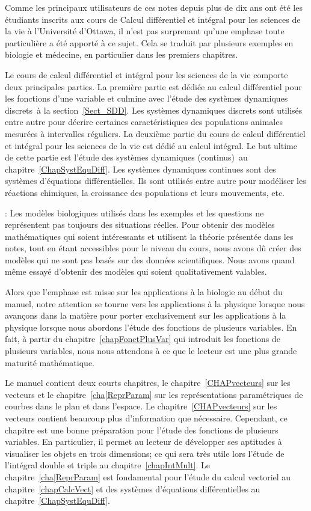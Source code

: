Comme les principaux utilisateurs de ces notes depuis plus de dix ans
ont été les étudiants inscrits aux cours de Calcul différentiel et
intégral pour les sciences de la vie à l'Université d'Ottawa, il n'est
pas surprenant qu'une emphase toute particulière a été apporté à ce
sujet.  Cela se traduit par plusieurs exemples en biologie et
médecine, en particulier dans les premiers chapitres.

Le cours de calcul différentiel et intégral pour les sciences de la
vie comporte deux principales parties.  La première partie
est dédiée au calcul différentiel pour les fonctions d'une variable et
culmine avec l'étude des \lgm systèmes dynamiques discrets\rgm\ à la
section~\ref{Sect_SDD}.  Les systèmes dynamiques discrets sont
utilisés entre autre pour décrire certaines caractéristiques des
populations animales mesurées à intervalles réguliers.
La deuxième partie du cours de calcul différentiel et intégral pour
les sciences de la vie est dédié au calcul intégral.  Le but ultime de
cette partie est l'étude des \lgm systèmes dynamiques (continus)\rgm\ 
au chapitre~\ref{ChapSystEquDiff}.  Les systèmes dynamiques continues
sont des systèmes d'équations différentielles.  Ils sont utilisés
entre autre pour modéliser les réactions chimiques, la croissance des
populations et leurs mouvements, etc.

: Les modèles biologiques utilisés
dans les exemples et les questions ne représentent pas toujours des
situations réelles.  Pour obtenir des modèles mathématiques qui soient
intéressants et utilisent la théorie présentée dans les notes, tout en
étant accessibles pour le niveau du cours, nous avons dû créer des
modèles qui ne sont pas basés sur des données scientifiques.  Nous
avons quand même essayé d'obtenir des modèles qui soient qualitativement
valables.

Alors que l'emphase est misse sur les applications à la biologie au
début du manuel, notre attention se tourne vers les applications à la
physique lorsque nous avançons dans la matière pour porter exclusivement
sur les applications à la physique lorsque nous abordons l'étude des
fonctions de plusieurs variables.  En fait, à partir du
chapitre~\ref{chapFonctPlusVar} qui introduit les fonctions de
plusieurs variables, nous nous attendons à ce que le lecteur est
une plus grande maturité mathématique.

Le manuel contient deux courts chapitres, le
chapitre~\ref{CHAPvecteurs} sur les vecteurs et le
chapitre~\ref{cha[ReprParam} sur les représentations paramétriques de
courbes dans le plan et dans l'espace.  Le
chapitre~\ref{CHAPvecteurs} sur les vecteurs contient beaucoup plus
d'information que nécessaire.  Cependant, ce chapitre est une bonne
préparation pour l'étude des fonctions de plusieurs variables.  En
particulier, il permet au lecteur de développer ses aptitudes à
visualiser les objets en trois dimensions; ce qui sera très utile lors
l'étude de l'intégral double et triple au chapitre~\ref{chapIntMult}.
Le chapitre~\ref{cha[ReprParam} est fondamental pour l'étude du calcul
vectoriel au chapitre~\ref{chapCalcVect} et des systèmes d'équations
différentielles au chapitre~\ref{ChapSystEquDiff}.


